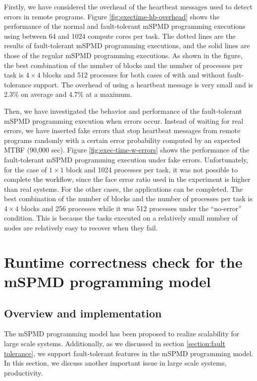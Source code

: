 \documentclass[graybox]{svmult}
\begin{document}
Firstly, we have considered the overhead of the heartbeat messages used to detect errors in remote programs. 
Figure \ref{fig:exectime-hb-overhead} shows the performance of 
the normal and fault-tolerant mSPMD programming executions using between 64 and 1024 compute cores per task. 
The dotted lines are the results of fault-tolerant mSPMD programming executions, and the solid lines are those of the regular mSPMD programming executions. As shown in the figure, the best combination of the number of blocks and the number of processes per task is $4\times 4$ blocks and 512 processes for both cases of with and without fault-tolerance support. 
The overhead of using a heartbeat message is very small and is 2.3\% on average and 4.7\% at a maximum.

Then, we have investigated the behavior and performance of the fault-tolerant mSPMD programming execution when errors occur. 
Instead of waiting for real errors, we have inserted fake errors that stop heartbeat messages from remote programs randomly with a certain error probability computed by an expected MTBF (90,000 sec). 
Figure \ref{fig:exec-time-w-errors} shows the performance of the fault-tolerant mSPMD programming execution under fake errors. Unfortunately, for the case of $1\times 1$ block and 1024 processes per task, it was not possible to complete the workflow, since the face error ratio used in the experiment is higher than real systems. 
For the other cases, the applications can be completed. 
The best combination of the number of blocks and the number of processes per task is $4 \times 4$ blocks and 256 processes while it was 512 processes under the ``no-error'' condition. This is because the tasks executed on a relatively small number of nodes are relatively easy to recover when they fail. 

\section{Runtime correctness check for the mSPMD programming model}
\label{section:Runtime correctness check for the mSPMD programming model}

\subsection{Overview and implementation}

The mSPMD programming model has been proposed to realize scalability for large scale systems. Additionally, as we discussed in section \ref{section:fault tolerance}, we support fault-tolerant features in the mSPMD programming model. 
In this section, we discuss another important issue in large scale systems, productivity. 
\end{document}
